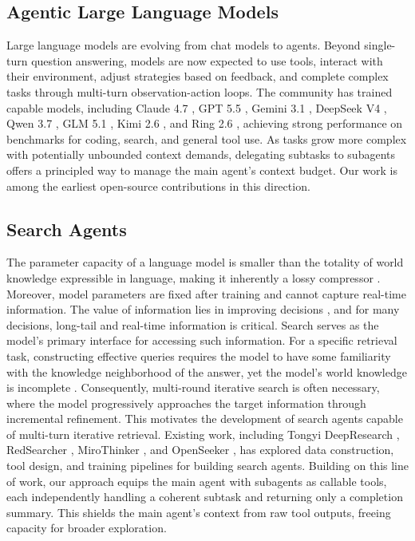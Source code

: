\documentclass{llmxive}
\begin{document}
\subsection{Agentic Large Language Models}
Large language models are evolving from chat models to agents. Beyond single-turn question answering, models are now expected to use tools, interact with their environment, adjust strategies based on feedback, and complete complex tasks through multi-turn observation-action loops. The community has trained capable models, including Claude 4.7 \citep{anthropic2026claude47}, GPT 5.5 \citep{openai2026gpt55}, Gemini 3.1 \citep{google2026gemini31}, DeepSeek V4 \citep{deepseek2026v4}, Qwen 3.7 \citep{qwen2026qwen37}, GLM 5.1 \citep{glm2026glm51}, Kimi 2.6 \citep{kimi2026k26}, and Ring 2.6 \citep{inclusionai2026ring26}, achieving strong performance on benchmarks for coding, search, and general tool use. As tasks grow more complex with potentially unbounded context demands, delegating subtasks to subagents offers a principled way to manage the main agent's context budget. Our work is among the earliest open-source contributions in this direction.

\subsection{Search Agents}
The parameter capacity of a language model is smaller than the totality of world knowledge expressible in language, making it inherently a lossy compressor \citep{deletang2024language, allen2024physics}. Moreover, model parameters are fixed after training and cannot capture real-time information. The value of information lies in improving decisions \citep{howard1966information}, and for many decisions, long-tail and real-time information is critical. Search serves as the model's primary interface for accessing such information. For a specific retrieval task, constructing effective queries requires the model to have some familiarity with the knowledge neighborhood of the answer, yet the model's world knowledge is incomplete \citep{belkin1980anomalous}. Consequently, multi-round iterative search is often necessary, where the model progressively approaches the target information through incremental refinement. This motivates the development of search agents capable of multi-turn iterative retrieval. Existing work, including Tongyi DeepResearch \citep{team2025tongyi}, RedSearcher \citep{chu2026redsearcher}, MiroThinker \citep{team2026mirothinker}, and OpenSeeker \citep{du2026openseeker}, has explored data construction, tool design, and training pipelines for building search agents. Building on this line of work, our approach equips the main agent with subagents as callable tools, each independently handling a coherent subtask and returning only a completion summary. This shields the main agent's context from raw tool outputs, freeing capacity for broader exploration.
\end{document}
